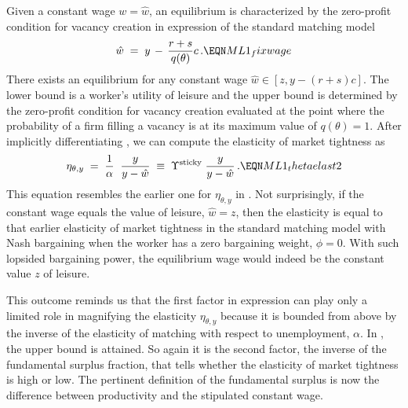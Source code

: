 
Given a constant wage $w=\hat w$, an equilibrium is
characterized by the zero-profit condition for vacancy creation
in expression  of the standard matching model
$$
\hat w\;=\; y \,-\, {r+s \over q(\theta)} c \,.      \EQN ML1_fixwage
$$
There exists an equilibrium for any constant wage
$\hat w \in [z, y-(r+s)c]$. The lower bound
is a worker's utility of leisure and the upper bound
is determined by the zero-profit condition for vacancy
creation evaluated at the  point where the  probability of a firm filling a vacancy
is at its maximum value of $q(\theta)=1$.
After implicitly differentiating ,
we can compute the elasticity of market tightness as
$$
\eta_{\theta,y}
\;=\; { 1 \over \alpha } \;\; {y \over y-\hat w}
\;\equiv\; \Upsilon^{\rm sticky}\; {y \over y-\hat w}\,.
                                                \EQN ML1_thetaelast2
$$
This equation resembles the earlier one for $\eta_{\theta,y}$  in
. Not surprisingly, if the constant wage
 equals the value of leisure, $\hat w = z$, then the
elasticity  is equal to that earlier
elasticity of market tightness in the standard
matching model with Nash bargaining when the worker has a zero
bargaining weight, $\phi=0$. With such lopsided
bargaining power, the equilibrium wage would indeed be the constant
value $z$ of leisure.

This outcome reminds us that the first factor in
expression  can play only a limited role in magnifying
the elasticity $\eta_{\theta,y}$ because it is bounded from above by the inverse of
the elasticity of matching with respect to unemployment, $\alpha$.   In
,  the upper bound is attained.
So again it is the second factor, the inverse of the fundamental
surplus fraction, that tells whether the elasticity
of market tightness is high or low. The pertinent definition of
the fundamental surplus is now the difference between productivity and
the stipulated constant wage.

